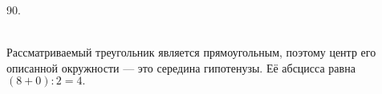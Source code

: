 90. \begin{figure}[ht!]
\end{figure}\\
Рассматриваемый треугольник является прямоугольным, поэтому центр его описанной окружности --- это середина гипотенузы. Её абсцисса равна $(8+0):2=4.$\\
